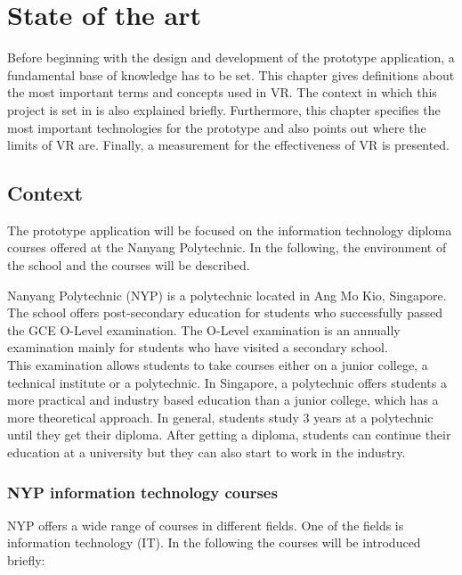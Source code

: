 \chapter{State of the art} \label{stateofarts}
Before beginning with the design and development of the prototype application, a fundamental base of knowledge has to be set. This chapter gives definitions about the most important terms and concepts used in VR. The context in which this project is set in is also explained briefly. Furthermore, this chapter specifies the most important technologies for the prototype and also points out where the limits of VR are. Finally, a measurement for the effectiveness of  VR is presented.

\section{Context}
The prototype application will be focused on the information technology diploma courses offered at the Nanyang Polytechnic. In the following, the environment of the school and the courses will be described.

Nanyang Polytechnic (NYP) is a polytechnic located in Ang Mo Kio, Singapore. The school offers post-secondary education for students who successfully passed the GCE O-Level examination. The O-Level examination is an annually examination mainly for students who have visited a secondary school. \cite{aboutOLevel} \\ 
This examination allows students to take courses either on a junior college, a technical institute or a polytechnic. In Singapore, a polytechnic offers students a more practical and industry based education than a junior college, which has a more theoretical approach. In general, students study 3 years at a polytechnic until they get their diploma. After getting a diploma, students can continue their education at a university but they can also start to work in the industry. \cite{schoolSystem}
\subsection{NYP information technology courses}
NYP offers a wide range of courses in different fields. One of the fields is information technology (IT). In the following the courses will be introduced briefly: \cite{nypCourses}

